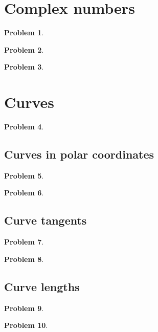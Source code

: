 \documentclass{article}
\newtheorem{problem}{Problem}
\begin{document}
\section{Complex numbers}
\begin{problem}

\end{problem}

\begin{problem}

\end{problem}
\begin{problem}

\end{problem}
\section{Curves}
\begin{problem}

\end{problem}
\subsection{Curves in polar coordinates}
\begin{problem}

\end{problem}
\begin{problem}

\end{problem}

\subsection{Curve tangents}
\begin{problem}

\end{problem}
\begin{problem}

\end{problem}
\subsection{Curve lengths}
\begin{problem}

\end{problem}
\begin{problem}

\end{problem}
\end{document}
